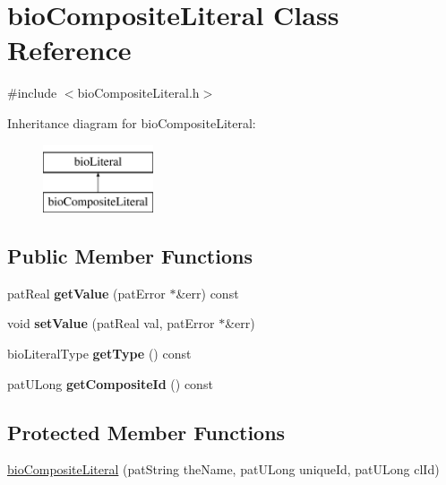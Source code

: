 \hypertarget{classbio_composite_literal}{}\section{bio\+Composite\+Literal Class Reference}
\label{classbio_composite_literal}


{\ttfamily \#include $<$bio\+Composite\+Literal.\+h$>$}

Inheritance diagram for bio\+Composite\+Literal\+:\begin{figure}[H]
\begin{center}
\leavevmode
\includegraphics[height=2.000000cm]{classbio_composite_literal}
\end{center}
\end{figure}
\subsection*{Public Member Functions}
\begin{DoxyCompactItemize}
\item 
\mbox{\label{classbio_composite_literal_afe535c02fbd5788556ac03016fb2129a}} 
pat\+Real {\bfseries get\+Value} (pat\+Error $\ast$\&err) const
\item 
\mbox{\label{classbio_composite_literal_a9ec9547a7004f2f64f154cc3859e6407}} 
void {\bfseries set\+Value} (pat\+Real val, pat\+Error $\ast$\&err)
\item 
\mbox{\label{classbio_composite_literal_a88baeb2be070ff57660bcc96f5244090}} 
bio\+Literal\+Type {\bfseries get\+Type} () const
\item 
\mbox{\label{classbio_composite_literal_acda0118434588abfa08f2eec76ab11f4}} 
pat\+U\+Long {\bfseries get\+Composite\+Id} () const
\end{DoxyCompactItemize}
\subsection*{Protected Member Functions}
\begin{DoxyCompactItemize}
\item 
\hyperlink{classbio_composite_literal_a429e1e95ca034b2e8054bb4ace26f56b}{bio\+Composite\+Literal} (pat\+String the\+Name, pat\+U\+Long unique\+Id, pat\+U\+Long cl\+Id)
\end{DoxyCompactItemize}

